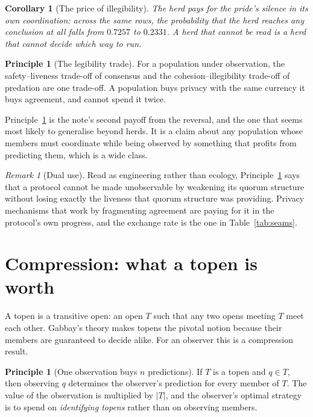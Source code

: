 \documentclass[11pt,a4paper]{article}
\theoremstyle{plain}
\newtheorem{corollary}[theorem]{Corollary}
\theoremstyle{definition}
\newtheorem{principle}[theorem]{Principle}
\theoremstyle{remark}
\newtheorem{remark}[theorem]{Remark}
\begin{document}
\begin{corollary}[The price of illegibility]\label{cor:pricecounter}
The herd pays for the pride's silence in its own coordination: across the same
rows, the probability that the herd reaches any conclusion at all falls from
$0.7257$ to $0.2331$. A herd that cannot be read is a herd that cannot decide
which way to run.
\end{corollary}

\begin{principle}[The legibility trade]\label{prin:trade}
For a population under observation, the safety--liveness trade-off of consensus
and the cohesion--illegibility trade-off of predation are one trade-off. A
population buys privacy with the same currency it buys agreement, and cannot
spend it twice.
\end{principle}

Principle~\ref{prin:trade} is the note's second payoff from the reversal, and
the one that seems most likely to generalise beyond herds. It is a claim about
any population whose members must coordinate while being observed by something
that profits from predicting them, which is a wide class.

\begin{remark}[Dual use]
Read as engineering rather than ecology, Principle~\ref{prin:trade} says that a
protocol cannot be made unobservable by weakening its quorum structure without
losing exactly the liveness that quorum structure was providing. Privacy
mechanisms that work by fragmenting agreement are paying for it in the
protocol's own progress, and the exchange rate is the one in
Table~\ref{tab:seams}.
\end{remark}

\section{Compression: what a topen is worth}\label{sec:topen}

A topen is a transitive open: an open $T$ such that any two opens meeting $T$
meet each other. Gabbay's theory makes topens the pivotal notion because their
members are guaranteed to decide alike. For an observer this is a compression
result.

\begin{principle}[One observation buys $n$ predictions]\label{prin:compress}
If $T$ is a topen and $q \in T$, then observing $q$ determines the observer's
prediction for every member of $T$. The value of the observation is multiplied
by $|T|$, and the observer's optimal strategy is to spend on \emph{identifying
topens} rather than on observing members.
\end{principle}
\end{document}
